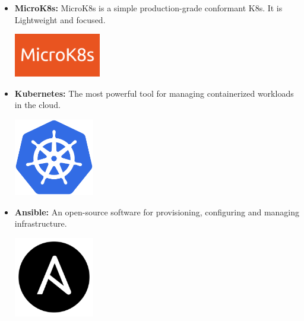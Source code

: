 \begin{itemize}
          \newpage
    \item \textbf{MicroK8s:} \newline \cite{microk8s} MicroK8s is a simple production-grade conformant K8s. It is Lightweight and focused. \newline
          \begin{minipage}{\linewidth}
              \centering
              \includegraphics[width=3.8cm]{src/assets/logos/microk8s.png}
          \end{minipage}
    \item \textbf{Kubernetes:} \newline The most powerful tool for managing containerized workloads in the cloud. \newline
          \begin{minipage}{\linewidth}
              \centering
              \includegraphics[width=3.5cm]{src/assets/logos/kubernetes_512x512.png}
          \end{minipage}
    \item \textbf{Ansible:} \newline An open-source software for provisioning, configuring and managing infrastructure. \newline
          \begin{minipage}{\linewidth}
              \centering
              \includegraphics[width=3.5cm]{src/assets/logos/ansible_200x200.png}
          \end{minipage}


\end{itemize}
